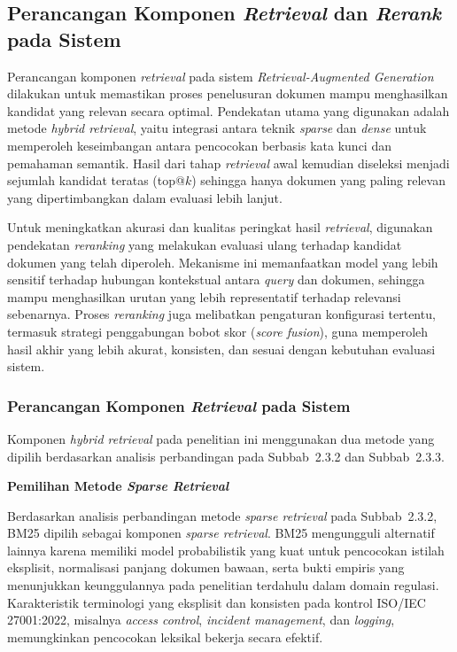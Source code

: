 \subsection{Perancangan Komponen \textit{Retrieval} dan \textit{Rerank} pada Sistem}

Perancangan komponen \textit{retrieval} pada sistem \textit{Retrieval-Augmented Generation} dilakukan untuk memastikan proses penelusuran dokumen mampu menghasilkan kandidat yang relevan secara optimal. Pendekatan utama yang digunakan adalah metode \textit{hybrid retrieval}, yaitu integrasi antara teknik \textit{sparse} dan \textit{dense} untuk memperoleh keseimbangan antara pencocokan berbasis kata kunci dan pemahaman semantik. Hasil dari tahap \textit{retrieval} awal kemudian diseleksi menjadi sejumlah kandidat teratas (top@$k$) sehingga hanya dokumen yang paling relevan yang dipertimbangkan dalam evaluasi lebih lanjut.

Untuk meningkatkan akurasi dan kualitas peringkat hasil \textit{retrieval}, digunakan pendekatan \textit{reranking} yang melakukan evaluasi ulang terhadap kandidat dokumen yang telah diperoleh. Mekanisme ini memanfaatkan model yang lebih sensitif terhadap hubungan kontekstual antara \textit{query} dan dokumen, sehingga mampu menghasilkan urutan yang lebih representatif terhadap relevansi sebenarnya. Proses \textit{reranking} juga melibatkan pengaturan konfigurasi tertentu, termasuk strategi penggabungan bobot skor (\textit{score fusion}), guna memperoleh hasil akhir yang lebih akurat, konsisten, dan sesuai dengan kebutuhan evaluasi sistem.

\subsubsection{Perancangan Komponen \textit{Retrieval} pada Sistem}

Komponen \textit{hybrid retrieval} pada penelitian ini menggunakan dua metode yang dipilih berdasarkan analisis perbandingan pada Subbab~2.3.2 dan Subbab~2.3.3.

\vspace{0.5em}
\noindent\textbf{Pemilihan Metode \textit{Sparse Retrieval}}

Berdasarkan analisis perbandingan metode \textit{sparse retrieval} pada Subbab~2.3.2, BM25 dipilih sebagai komponen \textit{sparse retrieval}. BM25 mengungguli alternatif lainnya karena memiliki model probabilistik yang kuat untuk pencocokan istilah eksplisit, normalisasi panjang dokumen bawaan, serta bukti empiris yang menunjukkan keunggulannya pada penelitian terdahulu dalam domain regulasi. Karakteristik terminologi yang eksplisit dan konsisten pada kontrol ISO/IEC 27001:2022, misalnya \textit{access control}, \textit{incident management}, dan \textit{logging}, memungkinkan pencocokan leksikal bekerja secara efektif.

